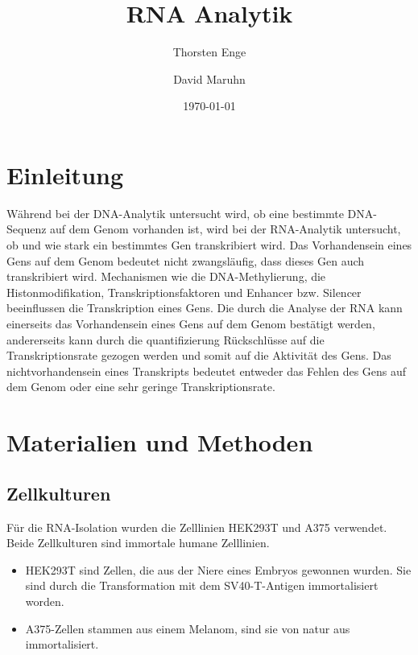 \documentclass{article}
\title{RNA Analytik}
\author{Thorsten Enge \and David Maruhn}
\date{\today}
\begin{document}
\maketitle

\tableofcontents
\newpage

\section{Einleitung}

Während bei der DNA-Analytik untersucht wird, ob eine bestimmte DNA-Sequenz auf dem Genom vorhanden ist, wird bei der RNA-Analytik untersucht, ob und wie stark ein bestimmtes Gen transkribiert wird. Das Vorhandensein eines Gens auf dem Genom bedeutet nicht zwangsläufig, dass dieses Gen auch transkribiert wird. Mechanismen wie die DNA-Methylierung, die Histonmodifikation, Transkriptionsfaktoren und Enhancer bzw. Silencer beeinflussen die Transkription eines Gens. Die durch die Analyse der RNA kann einerseits das Vorhandensein eines Gens auf dem Genom bestätigt werden, andererseits kann durch die quantifizierung Rückschlüsse auf die Transkriptionsrate gezogen werden und somit auf die Aktivität des Gens. Das nichtvorhandensein eines Transkripts bedeutet entweder das Fehlen des Gens auf dem Genom oder eine sehr geringe Transkriptionsrate. 

\section{Materialien und Methoden}

\subsection*{Zellkulturen}
Für die RNA-Isolation wurden die Zelllinien HEK293T und A375 verwendet.
Beide Zellkulturen sind immortale humane Zelllinien.
\begin{itemize}
    \item HEK293T sind Zellen, die aus der Niere eines Embryos gewonnen wurden.
    Sie sind durch die Transformation mit dem SV40-T-Antigen immortalisiert
    worden.
    \item A375-Zellen stammen aus einem Melanom, sind sie von natur aus
    immortalisiert.
\end{itemize}
\end{document}
